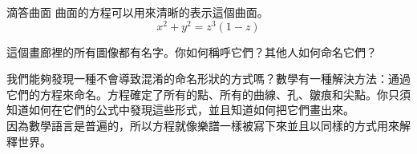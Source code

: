 \begin{surferPage}{滴答曲面}
曲面的方程可以用來清晰的表示這個曲面。\\
\smallskip
\[x^2 + y^2	= z^3	(1 - z) \]

\singlespacing

這個畫廊裡的所有圖像都有名字。你如何稱呼它們？其他人如何命名它們？\\

\vspace{0.3cm}

我們能夠發現一種不會導致混淆的命名形狀的方式嗎？數學有一種解決方法：通過它們的方程來命名。方程確定了所有的點、所有的曲線、孔、皺痕和尖點。你只須知道如何在它們的公式中發現這些形式，並且知道如何把它們畫出來。\\

\vspace{0.3cm}
因為數學語言是普遍的，所以方程就像樂譜一樣被寫下來並且以同樣的方式用來解釋世界。
\end{surferPage}
